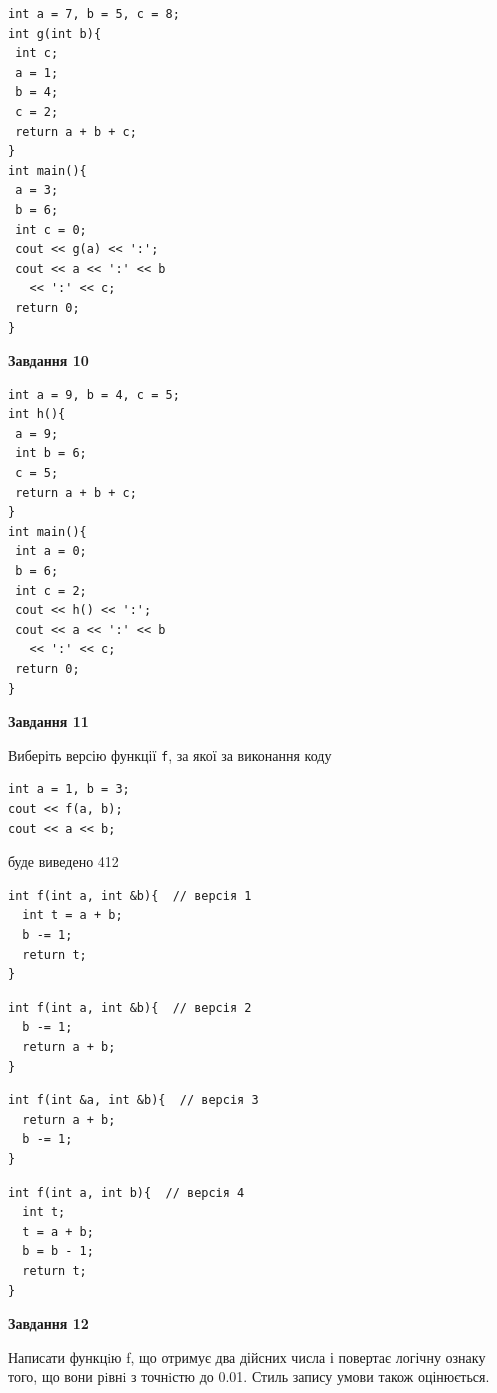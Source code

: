 \documentclass[12pt, ukrainian]{article}
\def\code#1{\Verb!#1!}
\begin{document}
{\begin {large}
\begin{minipage}[t]{7.0cm}
\begin{verbatim}
int a = 7, b = 5, c = 8;
int g(int b){
 int c;
 a = 1;
 b = 4;
 c = 2;
 return a + b + c;
}
int main(){
 a = 3;
 b = 6;
 int c = 0;
 cout << g(a) << ':';
 cout << a << ':' << b 
   << ':' << c;
 return 0;
}
\end{verbatim}



\begin{center}
\textbf{Завдання 10}
\end{center}
\vspace{-8mm}

\begin{verbatim}
int a = 9, b = 4, c = 5;
int h(){
 a = 9;
 int b = 6;
 c = 5;
 return a + b + c;
}
int main(){
 int a = 0;
 b = 6;
 int c = 2;
 cout << h() << ':';
 cout << a << ':' << b 
   << ':' << c;
 return 0;
}
\end{verbatim}

\end{minipage}
\vline \hspace{1mm}
\begin{minipage}[t]{11.0cm}

\begin{center}
\textbf{Завдання 11}
\end{center}
Виберіть версію функції \code{f}, за якої за виконання коду
\begin{verbatim}
int a = 1, b = 3;
cout << f(a, b);
cout << a << b;
\end{verbatim}

буде виведено 412

\begin{verbatim}
int f(int a, int &b){  // версія 1
  int t = a + b;
  b -= 1;
  return t;
}
\end{verbatim}

\vspace{-8mm}\begin{verbatim}
int f(int a, int &b){  // версія 2
  b -= 1;
  return a + b;
}
\end{verbatim}

\vspace{-8mm}\begin{verbatim}
int f(int &a, int &b){  // версія 3
  return a + b;
  b -= 1;
}
\end{verbatim}

\vspace{-8mm}\begin{verbatim}
int f(int a, int b){  // версія 4
  int t;
  t = a + b;
  b = b - 1;
  return t;
}
\end{verbatim}



\begin{center}
\textbf{Завдання 12}
\end{center}

Написати функцiю f, що отримує два дійсних числа і повертає логічну ознаку того, що вони рiвнi з точнiстю до 0.01. Стиль запису умови також оцінюється.\par

\end{minipage}

\end {large}}
\end{document}
